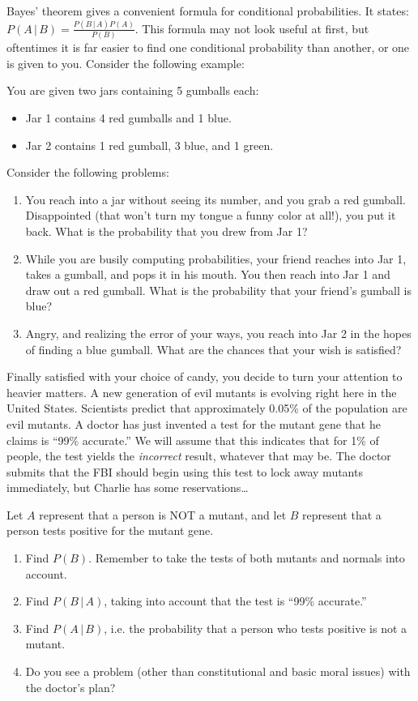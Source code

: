 Bayes' theorem gives a convenient formula for conditional probabilities. It states: $P(A\,|\,B) = \frac{P(B\,|\,A)P(A)}{P(B)}$. This formula may not look useful at first, but oftentimes it is far easier to find one conditional probability than another, or one is given to you. Consider the following example: \\


You are given two jars containing 5 gumballs each:
	\begin{itemize}
	\item Jar 1 contains 4 red gumballs and 1 blue.
	\item Jar 2 contains 1 red gumball, 3 blue, and 1 green.
	\end{itemize}
	
Consider the following problems:
	\begin{enumerate}[1.]
	\item You reach into a jar without seeing its number, and you grab a red gumball. Disappointed (that won't turn my tongue a funny color at all!), you put it back. What is the probability that you drew from Jar 1?
	\item While you are busily computing probabilities, your friend reaches into Jar 1, takes a gumball, and pops it in his mouth. You then reach into Jar 1 and draw out a red gumball. What is the probability that your friend's gumball is blue?
	\item Angry, and realizing the error of your ways, you reach into Jar 2 in the hopes of finding a blue gumball. What are the chances that your wish is satisfied?
	\end{enumerate}
	
Finally satisfied with your choice of candy, you decide to turn your attention to heavier matters. A new generation of evil mutants is evolving right here in the United States. Scientists predict that approximately 0.05\% of the population are evil mutants. A doctor has just invented a test for the mutant gene that he claims is ``99\% accurate.'' We will assume that this indicates that for 1\% of people, the test yields the \emph{incorrect} result, whatever that may be. The doctor submits that the FBI should begin using this test to lock away mutants immediately, but Charlie has some reservations\dots



Let $A$ represent that a person is NOT a mutant, and let $B$ represent that a person tests positive for the mutant gene.
	\begin{enumerate}[1.]
	\item Find $P(B)$. Remember to take the tests of both mutants and normals into account.
	\item Find $P(B\,|\,A)$, taking into account that the test is ``99\% accurate.''
	\item Find $P(A\,|\,B)$, i.e. the probability that a person who tests positive is not a mutant.
	\item Do you see a problem (other than constitutional and basic moral issues) with the doctor's plan?
	\end{enumerate}

